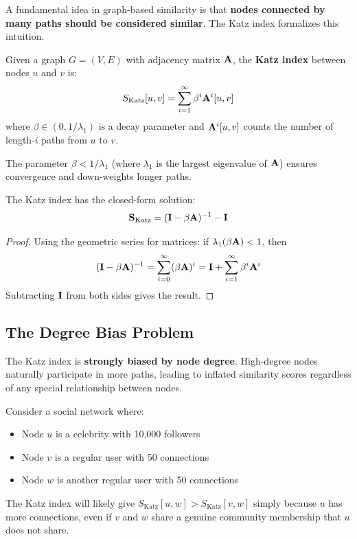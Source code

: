 \begin{notechapter}
A fundamental idea in graph-based similarity is that \textbf{nodes connected by many paths should be considered similar}. The Katz index formalizes this intuition.

\begin{definition}
Given a graph $G = (V, E)$ with adjacency matrix $\mathbf{A}$, the \textbf{Katz index} between nodes $u$ and $v$ is:
\begin{equation}
S_{\text{Katz}}[u,v] = \sum_{i=1}^{\infty} \beta^i \mathbf{A}^i[u,v]
\label{lhn-similarity:eq:katz}
\end{equation}
where $\beta \in (0, 1/\lambda_1)$ is a decay parameter and $\mathbf{A}^i[u,v]$ counts the number of length-$i$ paths from $u$ to $v$.
\end{definition}

The parameter $\beta < 1/\lambda_1$ (where $\lambda_1$ is the largest eigenvalue of $\mathbf{A}$) ensures convergence and down-weights longer paths.

\begin{theorem}
\label{lhn-similarity:thm:katz-closed}
The Katz index has the closed-form solution:
\begin{equation}
\mathbf{S}_{\text{Katz}} = (\mathbf{I} - \beta\mathbf{A})^{-1} - \mathbf{I}
\end{equation}
\end{theorem}

\begin{proof}
Using the geometric series for matrices: if $\lambda_1(\beta\mathbf{A}) < 1$, then
\[
(\mathbf{I} - \beta\mathbf{A})^{-1} = \sum_{i=0}^{\infty} (\beta\mathbf{A})^i = \mathbf{I} + \sum_{i=1}^{\infty} \beta^i \mathbf{A}^i
\]
Subtracting $\mathbf{I}$ from both sides gives the result.
\end{proof}

\subsection{The Degree Bias Problem}

\begin{warning}
The Katz index is \textbf{strongly biased by node degree}. High-degree nodes naturally participate in more paths, leading to inflated similarity scores regardless of any special relationship between nodes.
\end{warning}

\begin{example}
Consider a social network where:
\begin{itemize}
    \item Node $u$ is a celebrity with 10,000 followers
    \item Node $v$ is a regular user with 50 connections
    \item Node $w$ is another regular user with 50 connections
\end{itemize}
The Katz index will likely give $S_{\text{Katz}}[u, w] > S_{\text{Katz}}[v, w]$ simply because $u$ has more connections, even if $v$ and $w$ share a genuine community membership that $u$ does not share.
\end{example}


\end{notechapter}
